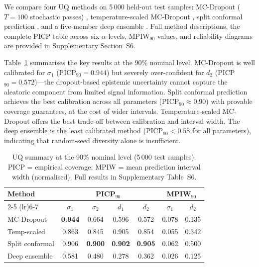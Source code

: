 \documentclass[journal]{IEEEtran}
\begin{document}
We compare four UQ methods on 5\,000 held-out test samples:
MC-Dropout ($T = 100$ stochastic passes) \citep{gal2016dropout},
temperature-scaled MC-Dropout \citep{guo2017calibration}, split
conformal prediction \citep{angelopoulos2023conformal}, and a
five-member deep ensemble \citep{lakshminarayanan2017}.  Full
method descriptions, the complete PICP table across six
$\alpha$-levels, MPIW$_{90}$ values, and reliability diagrams are
provided in Supplementary Section~S6.

Table~\ref{tab:uq_summary} summarises the key results at the 90\%
nominal level.  MC-Dropout is well calibrated for $\sigma_1$
(PICP$_{90} = 0.944$) but severely over-confident for $d_2$
(PICP$_{90} = 0.572$)---the dropout-based epistemic uncertainty
cannot capture the aleatoric component from limited signal
information.  Split conformal prediction achieves the best
calibration across all parameters (PICP$_{90} \approx 0.90$) with
provable coverage guarantees, at the cost of wider intervals.
Temperature-scaled MC-Dropout offers the best trade-off between
calibration and interval width.  The deep ensemble is the least
calibrated method (PICP$_{90} < 0.58$ for all parameters),
indicating that random-seed diversity alone is insufficient.

\begin{table}[t]
  \centering
  \caption{UQ summary at the 90\% nominal level
  (5\,000 test samples).  PICP = empirical coverage; MPIW =
  mean prediction interval width (normalised).  Full results
  in Supplementary Table~S6.}
  \label{tab:uq_summary}
  \footnotesize
  \setlength{\tabcolsep}{2pt}
  \begin{tabular}{lcccccc}
    \toprule
    Method & \multicolumn{4}{c}{PICP$_{90}$} & \multicolumn{2}{c}{MPIW$_{90}$} \\
    \cmidrule(lr){2-5} \cmidrule(lr){6-7}
     & $\sigma_1$ & $\sigma_2$ & $d_1$ & $d_2$ & $\sigma_1$ & $d_2$ \\
    \midrule
    MC-Dropout       & \textbf{0.944} & 0.664 & 0.596 & 0.572 & 0.078 & 0.135 \\
    Temp-scaled      & 0.863 & 0.845 & 0.905 & 0.854 & 0.055 & 0.342 \\
    Split conformal  & 0.906 & \textbf{0.900} & \textbf{0.902} & \textbf{0.905} & 0.062 & 0.500 \\
    Deep ensemble    & 0.581 & 0.480 & 0.278 & 0.362 & 0.026 & 0.125 \\
    \bottomrule
  \end{tabular}
\end{table}
\end{document}
